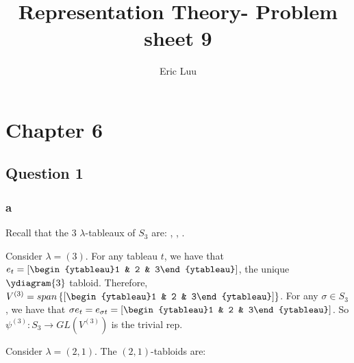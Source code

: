 \documentclass[]{article}
\title{Representation Theory- Problem sheet 9}
\author{Eric Luu}
\begin{document}
\maketitle

\section*{Chapter 6}
\subsection*{Question 1}
\subsubsection*{a}
Recall that the 3 $\lambda$-tableaux of $S_3$ are:
, , .

Consider $\lambda = (3)$. For any tableau $t$, we have that $e_t = \left[\begin{ytableau}1 & 2 & 3\end{ytableau}\right]$, the unique $\ydiagram{3}$ tabloid. Therefore, $V^{(3)} = span \left\{\left[\begin{ytableau}1 & 2 & 3\end{ytableau}\right]\right\}$. For any $\sigma \in S_3$, we have that $\sigma e_t = e_{\sigma t} = \left[\begin{ytableau}1 & 2 & 3\end{ytableau}\right]$. So $\psi^{(3)} : S_3 \rightarrow GL\left(V^{(3)}\right)$ is the trivial rep. 

Consider $\lambda = (2,1)$. The $(2,1)$-tabloids are:
\end{document}
